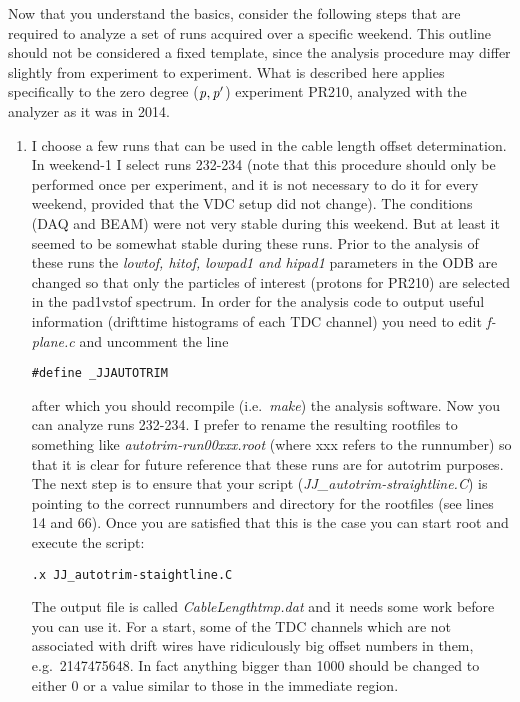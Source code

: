 \documentclass[11pt]{report}
\begin{document}
Now that you understand the basics, consider the following steps that are required to analyze
a set of runs acquired over a specific weekend.
This outline should not be considered a fixed template, since the analysis procedure may differ 
slightly from experiment to experiment.
What is described here applies specifically to the zero degree ($\it p,p'$) experiment PR210, analyzed
with the analyzer as it was in 2014.

\begin{enumerate}
\item 
I choose a few runs that can be used in the cable length offset determination. In weekend-1
I select runs 232-234 (note that this procedure should only be performed once per experiment, and
it is not necessary to do it for every weekend, provided that the VDC setup did not change).
The conditions (DAQ and BEAM) were not very stable during this weekend.
But at least it seemed to be somewhat stable during these runs.
Prior to the analysis of these runs the {\it lowtof, hitof, lowpad1 and hipad1} parameters in the ODB  
are changed so that only the particles of interest (protons for PR210)  are selected in the pad1vstof spectrum.
In order for the analysis code to output useful information (drifttime histograms of each
TDC channel) you need to edit {\it f-plane.c} and uncomment the line
\begin{verbatim} 
#define _JJAUTOTRIM
\end{verbatim}
after which you should recompile (i.e.~{\it make}) the analysis software.
Now you can analyze runs 232-234. 
I prefer to rename the resulting rootfiles to something like {\it autotrim-run00xxx.root}
(where xxx refers to the runnumber) so that it is clear
for future reference that these runs are for autotrim purposes.
%
The next step is to ensure that your script ({\it JJ\_autotrim-straightline.C})
is pointing to the correct runnumbers and directory for the rootfiles (see lines 14 and 66).
Once you are satisfied that this is the case you can start root and execute the script:
\begin{verbatim} 
.x JJ_autotrim-staightline.C 
\end{verbatim}
The output file is called {\it CableLengthtmp.dat}
and it needs some work before you can use it.
For a start, some of the TDC channels which are not associated with drift wires have
ridiculously big offset numbers in them, e.g.~2147475648.
In fact anything bigger than 1000 should be changed to either 0 or a value similar to those
in the immediate region.


\end{enumerate}
\end{document}
